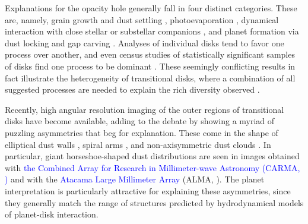 \documentclass[apj]{emulateapj}
\def\blue#1{\textcolor{blue}{#1}}
\begin{document}
Explanations for the opacity hole generally fall in four distinct
categories. These are, namely, grain growth and dust settling \citep{Brauer07,Dominik-Dullemond08,Zsom11,Birnstiel12}, photoevaporation
\citep{Alexander06,Cieza08,Pascucci-Sterzik09,Owen10}, 
dynamical interaction with close stellar or substellar companions
\citep{Ireland-Kraus08}, and planet
formation via dust locking \citep{Safronov69,Lyttleton72,Goldreich-Ward73,Youdin-Shu02,Johansen07} and gap
carving \citep{Papaloizou-Lin84,Lin-Papaloizou86a,Lin-Papaloizou86b,Bryden99,Paardekooper-Mellema04,Quillen04,Najita07,Andrews11}. 
Analyses of individual disks \citep{Calvet04,Calvet05,Espaillat08} tend to favor one process over another, and even census
studies of statistically significant samples of disks find one process
to be dominant \citep{Najita07,Cieza08}. These
seemingly conflicting results in fact illustrate the
heterogeneity of transitional disks, where a combination of all
suggested processes are needed to explain the rich diversity observed 
\citep{Cieza10,Muzerolle10,Merin10,Rosotti13,Clarke-Owen13}.   

Recently, high angular resolution imaging of the outer regions of transitional 
disks have become available, adding to the debate by showing a myriad of puzzling asymmetries 
that beg for explanation. These come in the shape of elliptical dust walls \citep{Isella12}, spiral arms
\citep{Muto12,Tang12}, and non-axisymmetric dust clouds \citep{Oppenheimer08,Brown09,Casassus12}. In particular, 
giant horseshoe-shaped dust distributions are seen in images obtained with \blue{the Combined Array for Research in Millimeter-wave Astronomy 
(CARMA, \citealt{Isella13})} and with the \blue{Atacama Large Millimeter Array} (ALMA, \citealt{Casassus13,vanderMarel13}). The planet interpretation is particularly attractive for 
explaining these asymmetries, since they generally match the range of structures predicted by hydrodynamical 
models of planet-disk interaction. 
\end{document}
